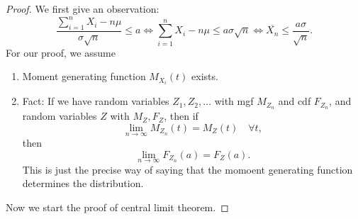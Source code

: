 \begin{proof}
    We first give an observation:
    \[
        \frac{\sum_{i=1}^n X_i  - n \mu}{\sigma \sqrt{n} } \le a \iff \sum_{i=1}^n X_i - n \mu \le a \sigma \sqrt{n} \iff \overline{X_n} \le \frac{a \sigma }{\sqrt{n} }.   
    \]
    For our proof, we assume 
    \begin{enumerate}
        \item Moment generating function \(M_{X_i}(t)\) exists. 
        \item Fact: If we have random variables \(Z_1, Z_2, \dots \) with mgf \(M_{Z_n}\) and cdf \(F_{Z_n}\), and random variables \(Z\) with \(M_Z, F_Z\), then if 
        \[
            \lim_{n \to \infty} M_{Z_n}(t) = M_Z(t) \quad \forall t, 
        \]
        then
        \[
            \lim_{n \to \infty} F_{Z_n}(a) = F_Z(a). 
        \]
        This is just the precise way of saying that the momoent generating function determines the distribution.
    \end{enumerate}

    Now we start the proof of central limit theorem.


\end{proof}
